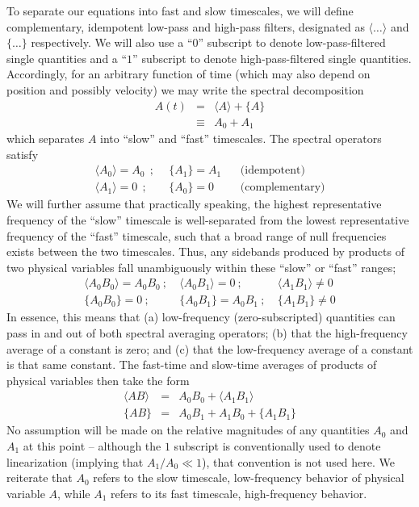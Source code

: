 To separate our equations into fast and slow timescales, we will define complementary, idempotent low-pass
and high-pass filters, designated as $\langle \ldots \rangle$ and $\{ \ldots \}$ respectively.
We will also use a ``$0$'' subscript to denote low-pass-filtered single quantities and a ``$1$'' subscript to
denote high-pass-filtered single quantities.  Accordingly, for an arbitrary function of time (which may
also depend on position and possibly velocity) we may write the spectral decomposition
\begin{eqnarray}
A(t) & = & \langle A \rangle + \{ A \} \nonumber \\
     & \equiv & A_{0} + A_{1} 
\end{eqnarray}
which separates $A$ into ``slow'' and ``fast'' timescales.  The spectral operators satisfy
\begin{eqnarray}
\langle A_{0} \rangle = A_{0} ~~;&~~ \{ A_{1} \} = A_{1} ~~&~~ \mbox{(idempotent)} \label{i1} \\
\langle A_{1} \rangle = 0 ~~;&~~ \{ A_{0} \} = 0 ~~&~~ \mbox{(complementary)} \label{i2}
\end{eqnarray} 
We will further assume that practically speaking, the highest representative frequency of the ``slow''
timescale is well-separated from the lowest representative frequency of the ``fast'' timescale, such
that a broad range of null frequencies exists between the two timescales.  Thus,
any sidebands produced by products of two physical variables fall unambiguously within these ``slow'' or ``fast''
ranges;
\begin{eqnarray}
\langle A_{0} B_{0} \rangle = A_{0} B_{0} ~;~&
\langle A_{0} B_{1} \rangle = 0 ~;~&
\langle A_{1} B_{1} \rangle \neq 0 \\
\{ A_{0} B_{0} \} = 0 ~;~&
\{ A_{0} B_{1} \} = A_{0} B_{1} ~;~&
\{ A_{1} B_{1} \} \neq 0
\end{eqnarray}
In essence, this means that (a) low-frequency (zero-subscripted) quantities can pass in and out of
both spectral averaging operators; (b) that the high-frequency average of a constant is zero; and
(c) that the low-frequency average of a constant is that same constant.
The fast-time and slow-time averages of products of physical variables then take the form 
\begin{eqnarray}
\langle A B \rangle & = & A_{0} B_{0} + \langle A_{1} B_{1} \rangle \\
\{ A B \} & = & A_{0} B_{1} + A_{1} B_{0} + \{ A_{1} B_{1} \}
\end{eqnarray}
No assumption will be made on the relative magnitudes of any quantities $A_{0}$ and $A_{1}$
at this point -- although the $1$ subscript is conventionally used to denote linearization
(implying that $A_{1}/A_{0} \ll 1$), that convention is not used here.  We reiterate that 
$A_{0}$ refers to the slow timescale, low-frequency behavior of physical variable $A$,  while 
$A_{1}$ refers to its fast timescale, high-frequency behavior.

